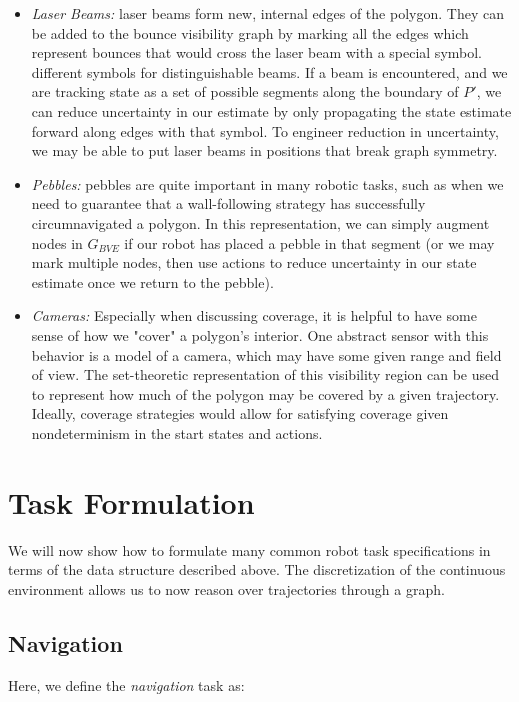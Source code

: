 \documentclass[]{article}  %
\begin{document}
\begin{itemize}
\item \emph{Laser Beams:} laser beams form new, internal edges of the polygon. They can be
added to the bounce visibility graph by marking all the edges which represent
bounces that would cross the laser beam with a special symbol. different symbols
for distinguishable beams. If a beam is encountered, and we are tracking state
as a set of possible segments along the boundary of $P'$, we can reduce
uncertainty in our estimate by only propagating the state estimate
forward along edges with that symbol. To engineer reduction in uncertainty,
we may be able to put laser beams in positions that break graph symmetry.
\item \emph{Pebbles:} pebbles are quite important in many robotic tasks, such as
when we need to guarantee that a wall-following strategy has successfully
circumnavigated a polygon. In this representation, we can simply augment nodes
in $G_{BVE}$ if our robot has placed a pebble in that segment (or we may mark
multiple nodes, then use actions to reduce uncertainty in our state estimate
once we return to the pebble).
\item \emph{Cameras:} Especially when discussing coverage, it is helpful to have
some sense of how we "cover" a polygon's interior. One abstract sensor with this
behavior is a model of a camera, which may have some given range and field of
view. The set-theoretic representation of this visibility region can be used to
represent how much of the polygon may be covered by a given trajectory. Ideally,
coverage strategies would allow for satisfying coverage given nondeterminism in
the start states and actions.
\end{itemize}

\section{Task Formulation}

We will now show how to formulate many common robot task specifications in terms
of the data structure described above. The discretization of the continuous
environment allows us to now reason over trajectories through a graph.


\subsection{Navigation}

Here, we define the \emph{navigation} task as:
\end{document}
